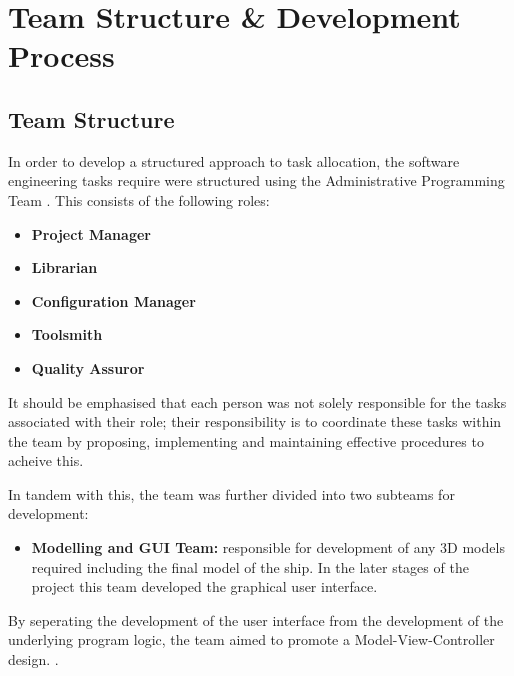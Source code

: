 \documentclass{article}
\begin{document}
\section{Team Structure \& Development Process}
\subsection{Team Structure}
In order to develop a structured approach to task allocation, the software engineering tasks require were structured using the Administrative Programming Team \cite{AdministrativeProgrammingTeam}. This consists of the following roles:
\begin{itemize}
\item{\textbf{Project Manager} }
\item{\textbf{Librarian} }
\item{\textbf{Configuration Manager} }
\item{\textbf{Toolsmith} }
\item{\textbf{Quality Assuror}}
\end{itemize}
It should be emphasised that each person was not solely responsible for the tasks associated with their role; their responsibility is to coordinate these tasks within the team by proposing, implementing and maintaining effective procedures to acheive this.

In tandem with this, the team was further divided into two subteams for development:
\begin{itemize}
\item{\textbf{Modelling and GUI Team:} responsible for development of any 3D models required including the final model of the ship. In the later stages of the project this team developed the graphical user interface.}
\end{itemize}
By seperating the development of the user interface from the development of the underlying program logic, the team aimed to promote a Model-View-Controller design. \cite[Ch 6.3.1]{SommervilleSoftwareEng}.
  
\end{document}
